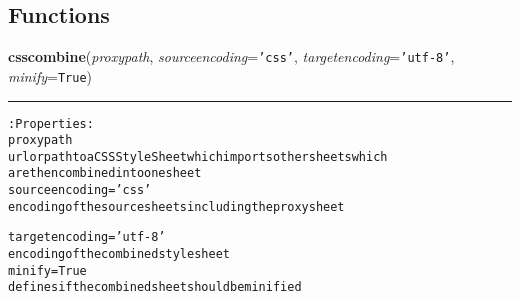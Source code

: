 
  \subsection{Functions}

    \label{cssutils:scripts:csscombine}

    \vspace{0.5ex}

\hspace{.8\funcindent}\begin{boxedminipage}{\funcwidth}

    \raggedright \textbf{csscombine}(\textit{proxypath}, \textit{sourceencoding}={\tt \texttt{'}\texttt{css}\texttt{'}}, \textit{targetencoding}={\tt \texttt{'}\texttt{utf-8}\texttt{'}}, \textit{minify}={\tt True})

    \vspace{-1.5ex}

    \rule{\textwidth}{0.5\fboxrule}
\setlength{\parskip}{2ex}
\begin{alltt}

:Properties:
    proxypath
        url or path to a CSSStyleSheet which imports other sheets which
        are then combined into one sheet
    sourceencoding = 'css'
        encoding of the source sheets including the proxy sheet
        
    targetencoding = 'utf-8'
        encoding of the combined stylesheet
    minify = True
        defines if the combined sheet should be minified
\end{alltt}

\setlength{\parskip}{1ex}
    \end{boxedminipage}


